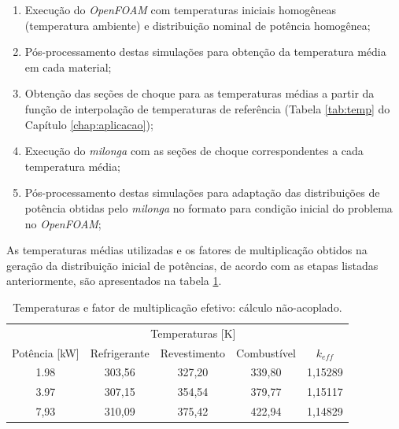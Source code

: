 \begin{enumerate}
\item Execução do \textit{OpenFOAM} com temperaturas iniciais homogêneas (temperatura ambiente) e distribuição nominal de potência homogênea;
\item Pós-processamento destas simulações para obtenção da temperatura média em cada material; %
\item Obtenção das seções de choque para as temperaturas médias a partir da função de interpolação de temperaturas
  de referência (Tabela \ref{tab:temp} do Capítulo \ref{chap:aplicacao});
\item Execução do \textit{milonga} com as seções de choque correspondentes a cada temperatura média;
\item Pós-processamento destas simulações para adaptação das distribuições de potência obtidas pelo \textit{milonga}
  no formato para condição inicial do problema no \textit{OpenFOAM};
\end{enumerate}

As temperaturas médias utilizadas e os fatores de multiplicação obtidos na geração da distribuição inicial
de potências, de acordo com as etapas listadas anteriormente, são apresentados na tabela \ref{tab:temp-keff}.

\begin{table}[htb]
  \centering
\caption{Temperaturas e fator de multiplicação efetivo: cálculo não-acoplado.}
\label{tab:temp-keff}
\begin{tabular}{ccccc}
\multicolumn{1}{l}{}         & \multicolumn{3}{c}{Temperaturas [K]}                                                                      & \multicolumn{1}{l}{}     \\ \cline{2-4}
\multicolumn{1}{c}{Potência [kW]} & \multicolumn{1}{c}{Refrigerante} & \multicolumn{1}{c}{Revestimento} & \multicolumn{1}{c}{Combustível} & \multicolumn{1}{c}{$k_{eff}$} \\ \hline
1.98                      & 303,56                         & 327,20                         & 339,80                        & 1,15289                  \\ \hline
3.97                      & 307,15                         & 354,54                         & 379,77                        & 1,15117                  \\ \hline
7,93                      & 310,09                         & 375,42                         & 422,94                        & 1,14829                 
\end{tabular}
\end{table}

